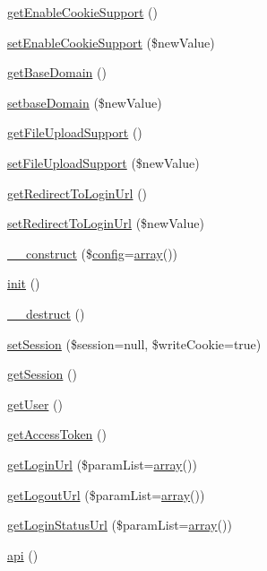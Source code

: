 \begin{DoxyCompactItemize}
\item 
\hyperlink{classCPSFacebook_ab002401bbd20f1d945afc24377102294}{getEnableCookieSupport} ()
\item 
\hyperlink{classCPSFacebook_a38dc6e2f0ac551d3ec16ab03fa9d725b}{setEnableCookieSupport} (\$newValue)
\item 
\hyperlink{classCPSFacebook_ab0b9668fe081b3b7eb36307bcb7688e8}{getBaseDomain} ()
\item 
\hyperlink{classCPSFacebook_a5438481a4c2c43b1ccf2dc5c8de9b7b7}{setbaseDomain} (\$newValue)
\item 
\hyperlink{classCPSFacebook_a11a2fe55342959e85616440f6287f24a}{getFileUploadSupport} ()
\item 
\hyperlink{classCPSFacebook_af19c4491f0d526c7b4194ca9217fc966}{setFileUploadSupport} (\$newValue)
\item 
\hyperlink{classCPSFacebook_af338297425aef1a6322e4f096b0b8a34}{getRedirectToLoginUrl} ()
\item 
\hyperlink{classCPSFacebook_a38575b53e5d51921b89d693e88bacaa9}{setRedirectToLoginUrl} (\$newValue)
\item 
\hyperlink{classCPSFacebook_af7f9493844d2d66e924e3c1df51ce616}{\_\-\_\-construct} (\$\hyperlink{events_8php_a3f176ffce3afa63656bfc989470e3e24}{config}=\hyperlink{list_8php_aa3205d038c7f8feb5c9f01ac4dfadc88}{array}())
\item 
\hyperlink{classCPSFacebook_a4be4055f3361d4800e16bc2e2e38cda6}{init} ()
\item 
\hyperlink{classCPSFacebook_a421831a265621325e1fdd19aace0c758}{\_\-\_\-destruct} ()
\item 
\hyperlink{classCPSFacebook_a83fd4ea8255385abd72c27a762691e2d}{setSession} (\$session=null, \$writeCookie=true)
\item 
\hyperlink{classCPSFacebook_aefa4c5bd150e2a7d525576d7959c6911}{getSession} ()
\item 
\hyperlink{classCPSFacebook_ae81b7186fb97a7c6457edcc68c9aa2ef}{getUser} ()
\item 
\hyperlink{classCPSFacebook_a5d251c70a3f9f9daaff7f00ec5f894c0}{getAccessToken} ()
\item 
\hyperlink{classCPSFacebook_a3fc2a3b447d666e9f8607da999a1ea2d}{getLoginUrl} (\$paramList=\hyperlink{list_8php_aa3205d038c7f8feb5c9f01ac4dfadc88}{array}())
\item 
\hyperlink{classCPSFacebook_ade0c69c82aebca82fd8bd98ad74439f2}{getLogoutUrl} (\$paramList=\hyperlink{list_8php_aa3205d038c7f8feb5c9f01ac4dfadc88}{array}())
\item 
\hyperlink{classCPSFacebook_ac6277cff127391498ddceffc115a6f94}{getLoginStatusUrl} (\$paramList=\hyperlink{list_8php_aa3205d038c7f8feb5c9f01ac4dfadc88}{array}())
\item 
\hyperlink{classCPSFacebook_aa238fcc5cb30759876aa89cd2e0711c1}{api} ()
\end{DoxyCompactItemize}
